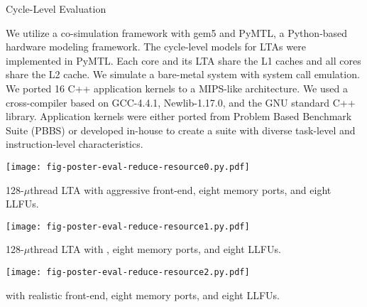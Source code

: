 \documentclass{cbxposter}
\begin{document}
\begin{frame}[fragile,t]{}
\begin{columns}[T]

\begin{column}{10.5in}


\begin{block}{Cycle-Level Evaluation}

  We utilize a co-simulation framework with gem5 and PyMTL, a Python-based
  hardware modeling framework. The cycle-level models for LTAs were
  implemented in PyMTL. Each core and its LTA share the L1 caches and all
  cores share the L2 cache. We simulate a bare-metal system with system
  call emulation. We ported 16 C++ application kernels to a MIPS-like
  architecture. We used a cross-compiler based on GCC-4.4.1,
  Newlib-1.17.0, and the GNU standard C++ library. Application kernels
  were either ported from Problem Based Benchmark Suite (PBBS) or
  developed in-house to create a suite with diverse task-level and
  instruction-level characteristics.


  \begin{center}

  \vspace{-0.2in}
  \texttt{[image: fig-poster-eval-reduce-resource0.py.pdf]}
  \vspace{-0.025in}

  128-$\mu$thread LTA with aggressive front-end, eight memory ports, and
  eight LLFUs.

  \vspace{0.3in}
  \texttt{[image: fig-poster-eval-reduce-resource1.py.pdf]}
  \vspace{-0.025in}

  128-$\mu$thread LTA with , eight memory ports,
  and eight LLFUs.

  \vspace{0.3in}
  \texttt{[image: fig-poster-eval-reduce-resource2.py.pdf]}
  \vspace{-0.025in}

   with realistic front-end, eight memory ports,
  and eight LLFUs.


\end{center}
\end{block}
\end{column}
\end{columns}
\end{frame}
\end{document}
